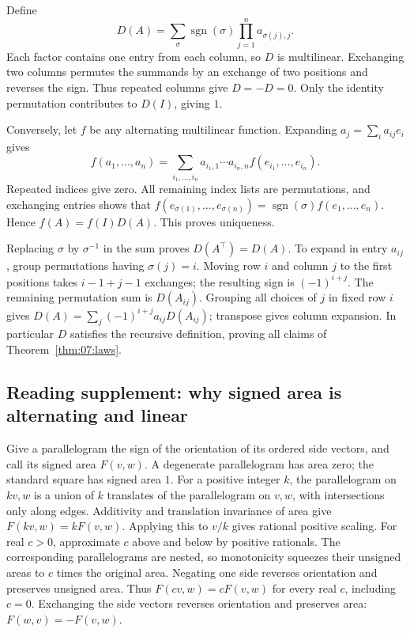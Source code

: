 Define
\[
 D(A)=\sum_{\sigma}\operatorname{sgn}(\sigma)
           \prod_{j=1}^n a_{\sigma(j),j}.
\]
Each factor contains one entry from each column, so \(D\) is multilinear.
Exchanging two columns permutes the summands by an exchange of two
positions and reverses the sign. Thus repeated columns give \(D=-D=0\).
Only the identity permutation contributes to \(D(I)\), giving \(1\).

Conversely, let \(f\) be any alternating multilinear function.
Expanding \(a_j=\sum_i a_{ij}e_i\) gives
\[
 f(a_1,\ldots,a_n)
 =\sum_{i_1,\ldots,i_n}a_{i_1,1}\cdots a_{i_n,n}
                      f(e_{i_1},\ldots,e_{i_n}).
\]
Repeated indices give zero. All remaining index lists are permutations,
and exchanging entries shows that
\(f(e_{\sigma(1)},\ldots,e_{\sigma(n)})
 =\operatorname{sgn}(\sigma)f(e_1,\ldots,e_n)\).
Hence \(f(A)=f(I)D(A)\). This proves uniqueness.

Replacing \(\sigma\) by \(\sigma^{-1}\) in the sum proves
\(D(A^\top)=D(A)\). To expand in entry \(a_{ij}\), group permutations
having \(\sigma(j)=i\). Moving row \(i\) and column \(j\) to the first
positions takes \(i-1+j-1\) exchanges; the resulting sign is
\((-1)^{i+j}\). The remaining permutation sum is \(D(A_{ij})\).
Grouping all choices of \(j\) in fixed row \(i\) gives
\(D(A)=\sum_j(-1)^{i+j}a_{ij}D(A_{ij})\); transpose gives column
expansion. In particular \(D\) satisfies the recursive definition, proving
all claims of Theorem~\ref{thm:07:laws}.

\subsection*{Reading supplement: why signed area is alternating and linear}
Give a parallelogram the sign of the orientation of its ordered side
vectors, and call its signed area \(F(v,w)\). A degenerate parallelogram
has area zero; the standard square has signed area \(1\).
For a positive integer \(k\), the parallelogram on \(kv,w\) is a union
of \(k\) translates of the parallelogram on \(v,w\), with intersections
only along edges. Additivity and translation invariance of area give
\(F(kv,w)=kF(v,w)\). Applying this to \(v/k\) gives rational positive
scaling. For real \(c>0\), approximate \(c\) above and below by positive
rationals. The corresponding parallelograms are nested, so monotonicity
squeezes their unsigned areas to \(c\) times the original area.
Negating one side reverses orientation and preserves unsigned area.
Thus \(F(cv,w)=cF(v,w)\) for every real \(c\), including \(c=0\).
Exchanging the side vectors reverses orientation and preserves area:
\(F(w,v)=-F(v,w)\).

